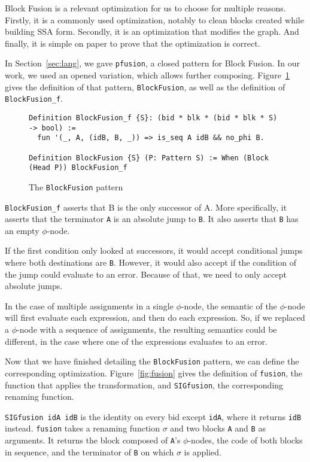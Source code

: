 \documentclass[11pt]{article}
\newcommand{\inlinecoq}[1]{\mbox{\lstinline[style=customcoq,columns=fixed,basewidth=.48em]{#1}}}
\newcommand{\ilc}[1]{\inlinecoq{#1}}
\begin{document}
Block Fusion is a relevant optimization for us to choose for multiple reasons. Firstly, it is a commonly used optimization, notably to clean blocks created while building SSA form. Secondly, it is an optimization that modifies the graph. And finally, it is simple on paper to prove that the optimization is correct.

In Section~\ref{sec:lang}, we gave \ilc{pfusion}, a closed pattern for Block Fusion. In our work, we used an opened variation, which allows further composing. Figure~\ref{fig:bfusion} gives the definition of that pattern, \ilc{BlockFusion}, as well as the definition of \ilc{BlockFusion_f}.

\begin{figure}
  \begin{lstlisting}[style=customcoq,basicstyle=\small\ttfamily]
Definition BlockFusion_f {S}: (bid * blk * (bid * blk * S) -> bool) :=
  fun '(_, A, (idB, B, _)) => is_seq A idB && no_phi B.

Definition BlockFusion {S} (P: Pattern S) := When (Block (Head P)) BlockFusion_f
  \end{lstlisting}
  \caption{The \ilc{BlockFusion} pattern}
  \label{fig:bfusion}
\end{figure}

\ilc{BlockFusion_f} asserts that B is the only successor of A. More specifically, it asserts that the terminator \ilc{A} is an absolute jump to \ilc{B}. It also asserts that \ilc{B} has an empty $\phi$-node.

If the first condition only looked at successors, it would accept conditional jumps where both destinations are \ilc{B}. However, it would also accept if the condition of the jump could evaluate to an error. Because of that, we need to only accept absolute jumps.

In the case of multiple assignments in a single $\phi$-node, the semantic of the $\phi$-node will first evaluate each expression, and then do each expression. So, if we replaced a $\phi$-node with a sequence of assignments, the resulting semantics could be different, in the case where one of the expressions evaluates to an error.

Now that we have finished detailing the \ilc{BlockFusion} pattern, we can define the corresponding optimization. Figure~\ref{fig:fusion} gives the definition of \ilc{fusion}, the function that applies the transformation, and \ilc{SIGfusion}, the corresponding renaming function.

\ilc{SIGfusion idA idB} is the identity on every bid except \ilc{idA}, where it returns \ilc{idB} instead. \ilc{fusion} takes a renaming function $\sigma$ and two blocks \ilc{A} and \ilc{B} as arguments. It returns the block composed of \ilc{A}'s $\phi$-nodes, the code of both blocks in sequence, and the terminator of \ilc{B} on which $\sigma$ is applied.
\end{document}
